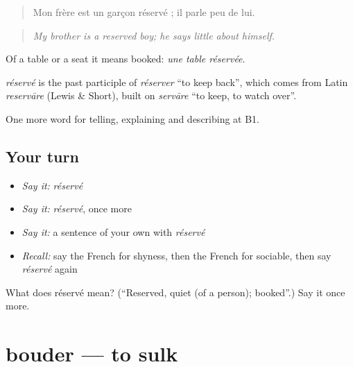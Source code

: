 \begin{quote}
Mon frère est un garçon réservé ; il parle peu de lui.
\end{quote}

\begin{quote}
\emph{My brother is a reserved boy; he says little about himself.}
\end{quote}

Of a table or a seat it means booked: \emph{une table réservée}.

\begin{cousinweb}
\emph{réservé} is the past participle of \emph{réserver} \textquotedblleft{}to keep back\textquotedblright{}, which comes from Latin \emph{reservāre} (Lewis \& Short), built on \emph{servāre} \textquotedblleft{}to keep, to watch over\textquotedblright{}.
\end{cousinweb}

\begin{grammarlens}[title={What you've built}]
One more word for telling, explaining and describing at B1.
\end{grammarlens}

\subsection*{Your turn}
\begin{itemize}
\raggedright
  \item \emph{Say it:} \emph{réservé}
  \item \emph{Say it:} \emph{réservé}, once more
  \item \emph{Say it:} a sentence of your own with \emph{réservé}
  \item \emph{Recall:} say the French for shyness, then the French for sociable, then say \emph{réservé} again
\end{itemize}

\begin{tcolorbox}[breakable,colback=teal!4,colframe=teal!35!black,title={Before you move on}]
What does réservé mean? (\textquotedblleft{}Reserved, quiet (of a person); booked\textquotedblright{}.) Say it once more.
\end{tcolorbox}
\section[bouder]{bouder — to sulk}

\label{lesson:FR-C466-bouder}



